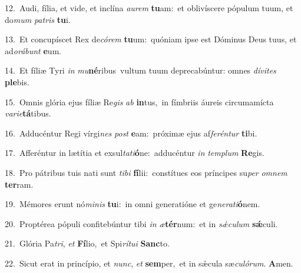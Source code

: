 {\numbfont\textcolor{\numbcolor}{12.}}~Audi, fília, et vide, et inclína \textit{au}\-\textit{rem} \textbf{tu}\-am:~\star et oblivíscere pópulum tuum, et do\textit{mum} \textit{pa}\-\textit{tris} \textbf{tu}\-i.\par
{\numbfont\textcolor{\numbcolor}{13.}}~Et concupíscet Rex de\-\textit{có}\-\textit{rem} \textbf{tu}\-um:~\star quóniam ipse est Dóminus Deus tuus, et ad\-\textit{o}\-\textit{rá}\textit{bunt} \textbf{e}\-um.\par
{\numbfont\textcolor{\numbcolor}{14.}}~Et fíliæ Tyri \textit{in} \textit{mu}\-\textbf{né}ribus~\star vultum tuum deprecabúntur: omnes \textit{dí}\-\textit{vi}\textit{tes} \textbf{ple}\-bis.\par
{\numbfont\textcolor{\numbcolor}{15.}}~Omnis glória ejus fíliæ Re\textit{gis} \textit{ab} \textbf{in}\-tus,~\star in fímbriis áureis circumamícta \textit{va}\-\textit{ri}\textit{e}\textbf{tá}tibus.\par
{\numbfont\textcolor{\numbcolor}{16.}}~Adducéntur Regi vírgi\textit{nes} \textit{post} \textbf{e}\-am:~\star próximæ ejus af\-\textit{fe}\-\textit{rén}\textit{tur} \textbf{ti}\-bi.\par
{\numbfont\textcolor{\numbcolor}{17.}}~Afferéntur in lætítia et exsul\-\textit{ta}\-\textit{ti}\textbf{ó}ne:~\star adducéntur \textit{in} \textit{tem}\-\textit{plum} \textbf{Re}\-gis.\par
{\numbfont\textcolor{\numbcolor}{18.}}~Pro pátribus tuis nati sunt \textit{ti}\-\textit{bi} \textbf{fí}\-lii:~\star constítues eos príncipes su\textit{per} \textit{om}\-\textit{nem} \textbf{ter}\-ram.\par
{\numbfont\textcolor{\numbcolor}{19.}}~Mémores erunt nó\-\textit{mi}\-\textit{nis} \textbf{tu}\-i:~\star in omni generatióne et ge\-\textit{ne}\-\textit{ra}\textit{ti}\textbf{ó}nem.\par
{\numbfont\textcolor{\numbcolor}{20.}}~Proptérea pópuli confitebúntur tibi \textit{in} \textit{æ}\-\textbf{tér}num:~\star et in \textit{sǽ}\-\textit{cu}\textit{lum} \textbf{sǽ}\-culi.\par
{\numbfont\textcolor{\numbcolor}{21.}}~Glória Pa\-\textit{tri}\-, \textit{et} \textbf{Fí}\-lio,~\star et Spi\-\textit{rí}\-\textit{tu}\textit{i} \textbf{Sanc}\-to.\par
{\numbfont\textcolor{\numbcolor}{22.}}~Sicut erat in princípio, et \textit{nunc}\-, \textit{et} \textbf{sem}\-per,~\star et in sǽcula sæ\-\textit{cu}\-\textit{ló}\textit{rum}. \textbf{A}\-men.\par
